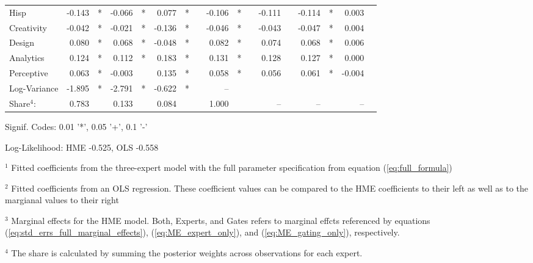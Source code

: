\documentclass[12pt]{article}
\begin{document}
\begin{landscape}
\begin{table}
\begin{threeparttable}
\begin{tabular}[l]{l r l r l r l c r l c r l r l r l}
  Hisp            & -0.143 & *      & -0.066 & *      &  0.077 & *      && -0.106 & *     && -0.111 &          & -0.114 & *        &  0.003 &        \\
  Creativity      & -0.042 & *      & -0.021 & *      & -0.136 & *      && -0.046 & *     && -0.043 &          & -0.047 & *        &  0.004 &        \\
  Design          &  0.080 & *      &  0.068 & *      & -0.048 & *      &&  0.082 & *     &&  0.074 &          &  0.068 & *        &  0.006 &        \\
  Analytics       &  0.124 & *      &  0.112 & *      &  0.183 & *      &&  0.131 & *     &&  0.128 &          &  0.127 & *        &  0.000 &        \\
  Perceptive      &  0.063 & *      & -0.003 &        &  0.135 & *      &&  0.058 & *     &&  0.056 &          &  0.061 & *        & -0.004 &        \\
  Log-Variance    & -1.895 & *      & -2.791 & *      & -0.622 & *      &&  --    &       &&  &          &  &          &  &        \\
  \cmidrule(l){2-3} \cmidrule(l){4-5} \cmidrule(l){6-7} \cmidrule(l){9-10} \cmidrule(l){12-13} \cmidrule(l){14-15} \cmidrule(l){16-17}
  Share$^{4}$:          & 0.783  &        & 0.133  &      & 0.084 &           &&  1.000 &       &&  --    &          &  --    &          &  --    &        \\
  \cmidrule{1-17}
        \end{tabular}
  
        \begin{tablenotes}
          \item Signif. Codes: 0.01 '*', 0.05 '+', 0.1 '-'
          \item Log-Likelihood: HME -0.525, OLS -0.558
          \item $^{1}$ Fitted coefficients from the three-expert model with the full parameter specification from equation (\ref{eq:full_formula})
          \item $^{2}$ Fitted coefficients from an OLS regression. These coefficient values can be compared to the HME coefficients to their left as well as to the margianal values to their right
          \item $^{3}$ Marginal effects for the HME model. Both, Experts, and Gates refers to marginal effcts referenced by equations (\ref{eq:std_errs_full_marginal_effects}), (\ref{eq:ME_expert_only}), and (\ref{eq:ME_gating_only}), respectively.
          \item $^{4}$ The share is calculated by summing the posterior weights across observations for each expert.
  
        \end{tablenotes} \label{tbl:3D_full_regressions_results}
  
  
      \end{threeparttable}
  
  \end{table}
  \end{landscape}
\end{document}
